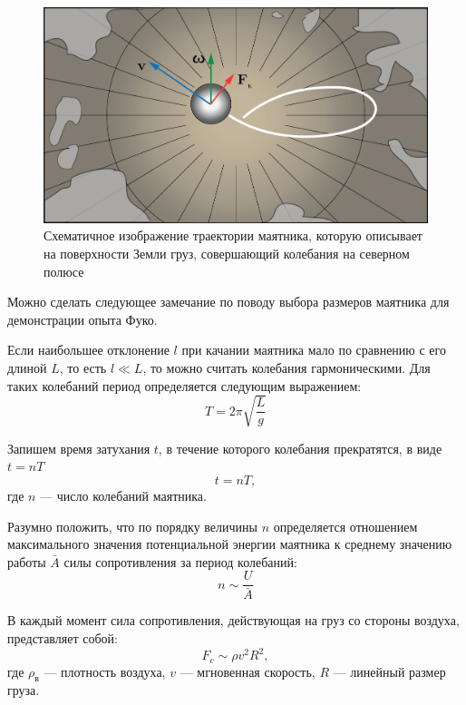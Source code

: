\documentclass[14pt,a4paper,oneside]{extarticle}	%
\begin{document}
	\begin{figure}[H] 	
		\centering 	
		\includegraphics[width=0.7\linewidth]{fuko-5.png}
		\caption{Схематичное изображение траектории маятника, которую описывает на поверхности Земли груз, совершающий колебания на северном полюсе}
		\label{fuko-5}
	\end{figure}
	
	Можно сделать следующее замечание по поводу выбора размеров маятника для демонстрации опыта Фуко. 
	
	Если наибольшее отклонение $ l $ при качании маятника мало по сравнению с его длиной $ L $, то есть $ l \ll L $, то можно считать колебания гармоническими.
	Для таких колебаний период определяется следующим выражением:
	\begin{equation}\label{fuko-1eq1}
	T = 2\pi \sqrt{\frac{L}{g}}
	\end{equation}
	
	Запишем время затухания $ t $, в течение которого колебания прекратятся, в виде $ t = nT $
	\begin{equation}\label{fuko-1eq2}
	t = nT,
	\end{equation}
	где $ n $ — число колебаний маятника.
	
	Разумно положить, что по порядку величины $ n $ определяется отношением максимального значения потенциальной энергии маятника к среднему значению работы $ \bar{A} $ силы сопротивления за период колебаний:
	 \begin{equation}\label{fuko-1eq3}
	 n \sim \frac{U}{\bar{A}}
	 \end{equation}
	 
	В каждый момент сила сопротивления, действующая на груз со стороны воздуха, представляет собой:
	\begin{equation}\label{fuko-1eq4}
	F_{c} \sim \rho v^{2}R^{2},
	\end{equation}
	где $ \rho_{\text{в}} $ — плотность воздуха, $ v $ — мгновенная скорость, $ R $ — линейный размер груза.
	
\end{document}

